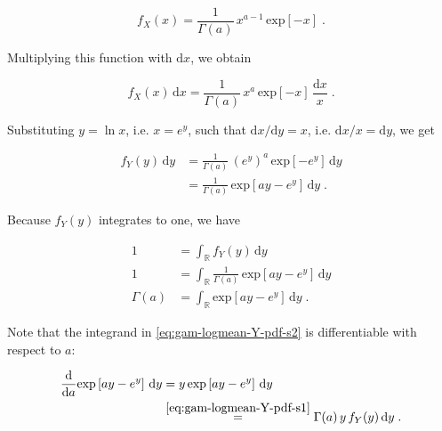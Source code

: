 \documentclass[a4paper,12pt,twoside]{book}
\begin{document}
\begin{equation} \label{eq:gam-logmean-X-pdf-s1}
f_X(x) = \frac{1}{\Gamma(a)} \, x^{a-1} \, \mathrm{exp} [-x] \; .
\end{equation}

Multiplying this function with $\mathrm{d}x$, we obtain

\begin{equation} \label{eq:gam-logmean-X-pdf-s2}
f_X(x) \, \mathrm{d}x = \frac{1}{\Gamma(a)} \, x^a \, \mathrm{exp} [-x] \, \frac{\mathrm{d}x}{x} \; .
\end{equation}

Substituting $y = \ln x$, i.e. $x = e^y$, such that $\mathrm{d}x/\mathrm{d}y = x$, i.e. $\mathrm{d}x/x = \mathrm{d}y$, we get

\begin{equation} \label{eq:gam-logmean-Y-pdf-s1}
\begin{split}
f_Y(y) \, \mathrm{d}y &= \frac{1}{\Gamma(a)} \, \left( e^y \right)^a \, \mathrm{exp} [-e^y] \, \mathrm{d}y \\
&= \frac{1}{\Gamma(a)} \, \mathrm{exp}\left[ ay - e^y \right] \, \mathrm{d}y \; .
\end{split}
\end{equation}

Because $f_Y(y)$ integrates to one, we have

\begin{equation} \label{eq:gam-logmean-Y-pdf-s2}
\begin{split}
1 &= \int_{\mathbb{R}} f_Y(y) \, \mathrm{d}y \\
1 &= \int_{\mathbb{R}} \frac{1}{\Gamma(a)} \, \mathrm{exp}\left[ ay - e^y \right] \, \mathrm{d}y \\
\Gamma(a) &= \int_{\mathbb{R}} \mathrm{exp}\left[ ay - e^y \right] \, \mathrm{d}y \; .
\end{split}
\end{equation}

Note that the integrand in \eqref{eq:gam-logmean-Y-pdf-s2} is differentiable with respect to $a$:

\begin{equation} \label{eq:gam-logmean-dfy-da}
\begin{split}
\frac{\mathrm{d}}{\mathrm{d}a} \mathrm{exp}\left[ ay - e^y \right] \, \mathrm{d}y &= y \, \mathrm{exp}\left[ ay - e^y \right] \, \mathrm{d}y \\
&\overset{\eqref{eq:gam-logmean-Y-pdf-s1}}{=} \Gamma(a) \, y \, f_Y(y) \, \mathrm{d}y \; .
\end{split}
\end{equation}
\end{document}
